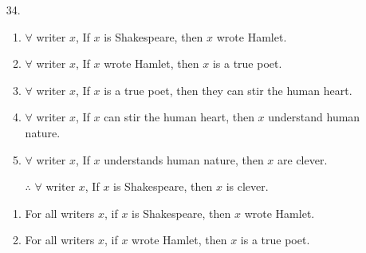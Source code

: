 \documentclass[12pt]{article}
\begin{document}
\begin{enumerate}
\begin{enumerate}
                \item[34.]
                    \begin{enumerate}
                        \item $\forall$ writer $x$, If $x$ is Shakespeare, then $x$ wrote Hamlet.
                        \item $\forall$ writer $x$, If $x$ wrote Hamlet, then $x$ is a true poet.
                        \item $\forall$ writer $x$, If $x$ is a true poet, then they can stir the human heart.
                        \item $\forall$ writer $x$, If $x$ can stir the human heart, then $x$ understand human nature.
                        \item $\forall$ writer $x$, If $x$ understands human nature, then $x$ are clever.
                        \item[$\therefore$] $\forall$ writer $x$, If $x$ is Shakespeare, then $x$ is clever.

                    \end{enumerate}
                    \begin{enumerate}
                        \item For all writers \( x \), if \( x \) is Shakespeare, then \( x \) wrote Hamlet.
                        \begin{center}
                        \end{center}
                        
                        \item For all writers \( x \), if \( x \) wrote Hamlet, then \( x \) is a true poet.
                        \begin{center}
                        \end{center}
                        

\end{enumerate}
\end{enumerate}
\end{enumerate}
\end{document}

